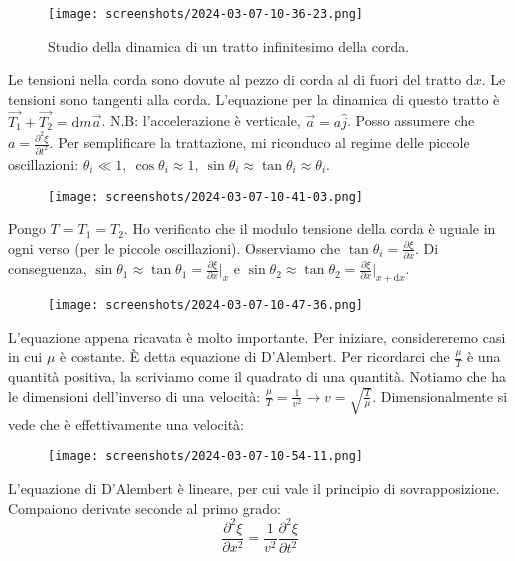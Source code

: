 \begin{figure}[H]
	\centering
	\texttt{[image: screenshots/2024-03-07-10-36-23.png]}
	\caption{Studio della dinamica di un tratto infinitesimo della corda.}
\end{figure}

Le tensioni nella corda sono dovute al pezzo di corda al di fuori del tratto \(\mathrm{d}x \). Le tensioni sono tangenti alla corda. L'equazione per la dinamica di questo tratto è \(\vec{T_1} +\vec{T_2} = \mathrm{d}m \vec{a} \). N.B: l'accelerazione è verticale, \(\vec{a} = a \hat{j} \). Posso assumere che \(a=\frac{\partial ^{2} \xi }{\partial t^{2} } \). Per semplificare la trattazione, mi riconduco al regime delle piccole oscillazioni: \(\theta _i \ll  1,\ \cos \theta _i \approx 1,\ \sin \theta _i \approx \tan \theta _i \approx \theta _i \).

\begin{figure}[H]
	\centering
	\texttt{[image: screenshots/2024-03-07-10-41-03.png]}
\end{figure}

Pongo \(T=T_1=T_2\). Ho verificato che il modulo tensione della corda è uguale in ogni verso (per le piccole oscillazioni). Osserviamo che \(\tan \theta _i = \frac{\partial \xi}{\partial x} \). Di conseguenza, \(\sin \theta _1 \approx \tan \theta _1= \frac{\partial \xi }{\partial x} \vert_x \) e \(\sin \theta _2 \approx \tan \theta _2 = \frac{\partial \xi }{\partial x}\vert_{x+\mathrm{d}x }  \).

\begin{figure}[H]
	\centering
	\texttt{[image: screenshots/2024-03-07-10-47-36.png]}
\end{figure}

L'equazione appena ricavata è molto importante. Per iniziare, considereremo casi in cui \(\mu \) è costante. È detta equazione di D'Alembert. Per ricordarci che \(\frac{\mu }{T}\) è una quantità positiva, la scriviamo come il quadrato di una quantità. Notiamo che ha le dimensioni dell'inverso di una velocità: \(\frac{\mu }{T} = \frac{1}{v^{2} } \to v=\sqrt{\frac{T}{\mu }} \). Dimensionalmente si vede che è effettivamente una velocità:
\begin{figure}[H]
	\centering
	\texttt{[image: screenshots/2024-03-07-10-54-11.png]}
\end{figure}
L'equazione di D'Alembert è lineare, per cui vale il principio di sovrapposizione. Compaiono derivate seconde al primo grado:
\begin{equation}
	\label{eq:dalembert_1d}
	\frac{\partial^{2}  \xi }{\partial x^{2} } = \frac{1}{v^{2} }\frac{\partial ^{2} \xi }{\partial t^{2} } 
\end{equation}